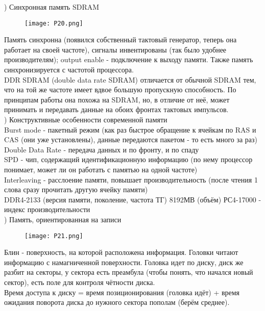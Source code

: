 ) Синхронная память SDRAM \\
\begin{figure}[H]
    \centering
    \texttt{[image: P20.png]}
\end{figure}
\noindent Память синхронна (появился собственный тактовый генератор, теперь она работает на своей частоте), сигналы инвентированы (так было удобнее производителям); output enable - подключение к выходу памяти. Также память синхронизируется с частотой процессора. \\
DDR SDRAM (double data rate SDRAM) отличается от обычной SDRAM тем, что на той же частоте имеет вдвое большую пропускную способность. По принципам работы она похожа на SDRAM, но, в отличие от неё, может принимать и передавать данные на обоих фронтах тактовых импульсов. \\
\newpage
{}) Конструктивные особенности современной памяти \\
Burst mode - пакетный режим (как раз быстрое обращение к ячейкам по RAS и CAS (они уже установлены), данные передаются пакетом - то есть много за раз) \\
Double Data Rate - передача данных и по фронту, и по спаду \\
SPD - чип, содержащий идентификационную информацию (по нему процессор понимает, может ли он работать с памятью на одной частоте) \\
Interleaving - расслоение памяти, повышает производительность (после чтения 1 слова сразу прочитать другую ячейку памяти) \\
DDR4-2133 (версия памяти, поколение, частота ТГ) 8192МВ (объём) РС4-17000 -  индекс
производительности \\

) Память, ориентированная на записи \\
\begin{figure}[H]
    \centering
    \texttt{[image: P21.png]}
\end{figure}
\noindent Блин - поверхность, на которой расположена информация. Головки читают информацию с намагниченной поверхности. Головка идет по диску, диск же разбит на секторы, у сектора есть преамбула (чтобы понять, что начался новый сектор), есть поле для контроля чётности диска. \\
Время доступа к диску = время позиционирования (головка идёт) + время ожидания поворота диска до нужного сектора пополам (берём среднее). \\

